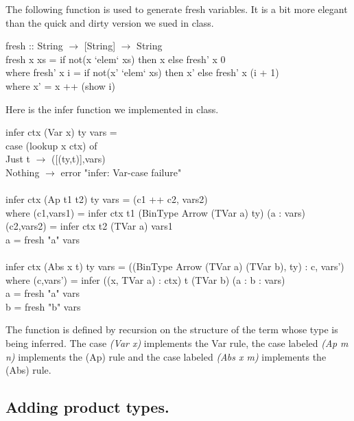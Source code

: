 \documentclass[11pt]{article}
\begin{document}
The following function is used to generate fresh variables.  It is a bit more
elegant than the quick and dirty version we sued in class.

\begin{program**}
\> fresh :: String $\rightarrow$ [String] $\rightarrow$ String\\
\> fresh x xs = if not(x `elem` xs) then x else fresh' x 0   \\
\>    where  fresh' x i  = if not(x' `elem` xs) then x' else fresh' x (i + 1)  \\
\>        where x' = x ++ (show i) \\
\end{program**}


Here is the infer function we implemented in class.

\begin{program**}
\> infer ctx  (Var x) ty vars =  \\
\>    case (lookup x ctx) of \\
\>       Just t $\rightarrow$ ([(ty,t)],vars) \\
\>       Nothing $\rightarrow$ error "infer: Var-case  failure" \\
\>   \\
\> infer ctx (Ap t1 t2) ty vars = (c1 ++ c2, vars2) \\
\>     where (c1,vars1) = infer ctx t1 (BinType Arrow (TVar a) ty) (a : vars) \\
\>           (c2,vars2) = infer ctx t2 (TVar a) vars1 \\
\>           a =  fresh "a" vars \\
\>   \\
\> infer ctx (Abs x t) ty vars = ((BinType Arrow (TVar a) (TVar b), ty) : c, vars') \\
\>    where (c,vars') = infer ((x, TVar a) : ctx) t (TVar b) (a : b : vars) \\
\>          a = fresh "a" vars \\
\>          b = fresh "b" vars \\
\end{program**}

The function is defined by recursion on the structure of the term whose type is
being inferred.  The case {\it{(Var x)}} implements the Var rule, the case
labeled {\it{(Ap m n)}} implements the (Ap) rule and the case labeled {\it{(Abs
x m)}} implements the (Abs) rule.


\subsection{Adding product types.}
\end{document}
